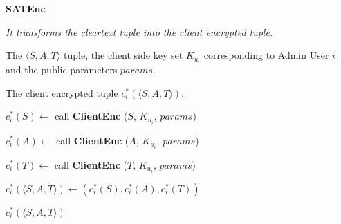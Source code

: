 \documentclass[epsfig,a4paper,11pt,titlepage]{book}
\numberwithin{algorithm}{chapter}
\newcommand{\algofontsize}{\fontsize{11}{12}\selectfont}
\begin{document}
\begin{algorithm} [htp]
{\algofontsize
\caption{\textbf{SATEnc}}

\label{algo:espoon-deploy-sat-client-side}

\begin{algorithmic}[1]

\INPUT \emph{It transforms the cleartext tuple into the client encrypted tuple.}

\Require The $\langle S, A, T \rangle$ tuple, the client side key set $K_{u_i}$ corresponding to Admin User $i$ and the public parameters $params$.

\Ensure The client encrypted tuple $c^*_i (\langle S, A, T \rangle)$.

\medskip

\State $c^*_i (S) \leftarrow$ call \textbf{ClientEnc} ($S$, $K_{u_i}$, $params$) \label{line:espoon-deploy-s-client-call}

\State $c^*_i (A) \leftarrow$ call \textbf{ClientEnc} ($A$, $K_{u_i}$, $params$) \label{line:espoon-deploy-a-client-call}

\State $c^*_i (T) \leftarrow$ call \textbf{ClientEnc} ($T$, $K_{u_i}$, $params$) \label{line:espoon-deploy-t-client-call}

\State $c^*_i (\langle S, A, T \rangle) \leftarrow (c^*_i (S), c^*_i (A), c^*_i (T))$ \label{line:espoon-deploy-sat-client-assignment}

\Return $c^*_i (\langle S, A, T \rangle)$

\end{algorithmic}
}
\end{algorithm}
\end{document}
